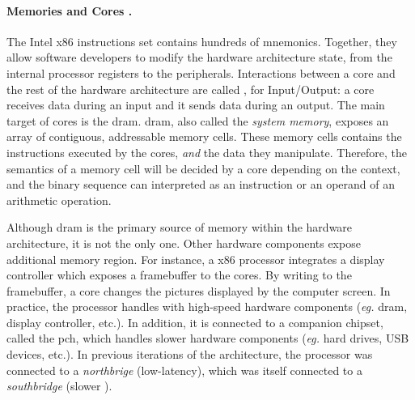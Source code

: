 \paragraph{Memories and Cores \IOs.}
%
The Intel x86 instructions set contains hundreds of mnemonics.
%
Together, they allow software developers to modify the hardware architecture
state, from the internal processor registers to the peripherals.
%
Interactions between a core and the rest of the hardware architecture are called
\IOs, for Input/Output: a core receives data during an input and it sends data
during an output.
%
The main target of cores \IOs is the \ac{dram}.
%
\ac{dram}, also called the \emph{system memory}, exposes an array of contiguous,
addressable memory cells.
%
These memory cells contains the instructions executed by the cores, \emph{and}
the data they manipulate.
%
Therefore, the semantics of a memory cell will be decided by a core depending on
the context, and the binary sequence can interpreted as an instruction or an
operand of an arithmetic operation.

Although \ac{dram} is the primary source of memory within the hardware
architecture, it is not the only one.
%
Other hardware components expose additional memory region.
%
For instance, a x86 processor integrates a display controller which exposes a
framebuffer to the cores.
%
By writing to the framebuffer, a core changes the pictures displayed by the
computer screen.
%
In practice, the processor handles \IOs with high-speed hardware components
(\emph{eg.} \ac{dram}, display controller, etc.).
%
In addition, it is connected to a companion chipset, called the
\ac{pch}, which handles slower hardware components (\emph{eg.}
hard drives, USB devices, etc.).
%
In previous iterations of the architecture, the processor was connected to a
\emph{northbrige} (low-latency), which was itself connected to a
\emph{southbridge} (slower \IOs).

